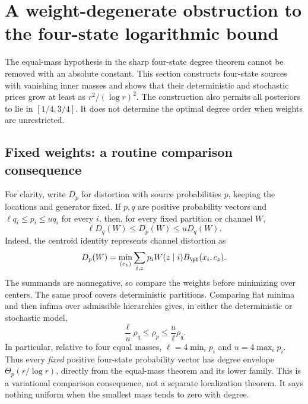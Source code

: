 \section{A weight-degenerate obstruction to the four-state logarithmic bound}
\label{sec:ext-weights}
The equal-mass hypothesis in the sharp four-state degree theorem cannot be
removed with an absolute constant. This section constructs four-state sources
with vanishing inner masses and shows that their deterministic and stochastic
prices grow at least as $r^2/(\log r)^2$. The construction also permits all
posteriors to lie in $[1/4,3/4]$. It does not determine the optimal degree order
when weights are unrestricted.

\subsection{Fixed weights: a routine comparison consequence}
For clarity, write $D_p$ for distortion with source probabilities $p$, keeping
the locations and generator fixed. If $p,q$ are positive probability vectors
and $\ell q_i\le p_i\le u q_i$ for every $i$, then, for every fixed partition
or channel $W$,
\begin{equation}
 \ell D_q(W)\le D_p(W)\le uD_q(W).
 \label{eq:ext-weightcomparison}
\end{equation}
Indeed, the centroid identity represents channel distortion as
\[
 D_p(W)=\min_{(c_z)}\sum_{i,z}p_iW(z\mid i)B_\ph(x_i,c_z).
\]
The summands are nonnegative, so compare the weights before minimizing over
centers. The same proof covers deterministic partitions. Comparing flat
minima and then infima over admissible hierarchies gives, in either the
deterministic or stochastic model,
\[
 \frac{\ell}{u}\rho_q\le\rho_p\le\frac{u}{\ell}\rho_q.
\]
In particular, relative to four equal masses, $\ell=4\min_i p_i$ and
$u=4\max_i p_i$. Thus every \emph{fixed} positive four-state probability vector
has degree envelope $\Theta_p(r/\log r)$, directly from the equal-mass theorem
and its lower family. This is a variational comparison consequence, not a
separate localization theorem. It says nothing uniform when the smallest
mass tends to zero with degree.

